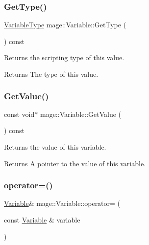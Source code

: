 \subsubsection{\texorpdfstring{Get\+Type()}{GetType()}}
{\footnotesize\ttfamily \hyperlink{namespacemage_a530428e73bac0ba7fe84b29086a9e33a}{Variable\+Type} mage\+::\+Variable\+::\+Get\+Type (\begin{DoxyParamCaption}{ }\end{DoxyParamCaption}) const\hspace{0.3cm}{\ttfamily [noexcept]}}

Returns the scripting type of this value.

\begin{DoxyReturn}{Returns}
The type of this value. 
\end{DoxyReturn}
\hypertarget{structmage_1_1_variable_a2ca2f704f2234425bbc751bc76a16ca5}{}\label{structmage_1_1_variable_a2ca2f704f2234425bbc751bc76a16ca5} 
\subsubsection{\texorpdfstring{Get\+Value()}{GetValue()}}
{\footnotesize\ttfamily const void$\ast$ mage\+::\+Variable\+::\+Get\+Value (\begin{DoxyParamCaption}{ }\end{DoxyParamCaption}) const\hspace{0.3cm}{\ttfamily [noexcept]}}

Returns the value of this variable.

\begin{DoxyReturn}{Returns}
A pointer to the value of this variable. 
\end{DoxyReturn}
\hypertarget{structmage_1_1_variable_a461893d21d4a48a548b1df5a89c58793}{}\label{structmage_1_1_variable_a461893d21d4a48a548b1df5a89c58793} 
\subsubsection{\texorpdfstring{operator=()}{operator=()}\hspace{0.1cm}{\footnotesize\ttfamily [1/2]}}
{\footnotesize\ttfamily \hyperlink{structmage_1_1_variable}{Variable}\& mage\+::\+Variable\+::operator= (\begin{DoxyParamCaption}\item[{const \hyperlink{structmage_1_1_variable}{Variable} \&}]{variable }\end{DoxyParamCaption})\hspace{0.3cm}{\ttfamily [default]}}

